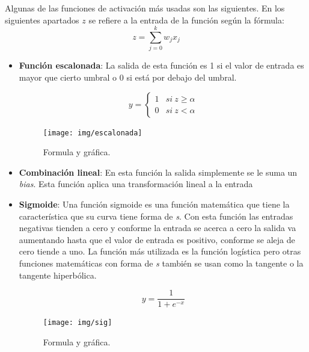 \documentclass[12pt,a4paper]{article}
\begin{document}
Algunas de las funciones de activación más usadas son las siguientes. En los siguientes apartados $z$ se refiere a la entrada de la función según la fórmula:
\begin{equation*}
z = \sum_{j=0}^{k} w_{j} x_{j}
\end{equation*}

\begin{itemize}
\item \textbf{Función escalonada}: La salida de esta función es 1 si el valor de entrada es mayor que cierto umbral o 0 si está por debajo del umbral.

\begin{figure}[H]
\centering\begin{minipage}[H]{0.5\textwidth}
\large
\begin{equation*}
y = \begin{cases}
1 & si \: z \geq \alpha \\
0 & si \: z < \alpha
\end{cases}
\end{equation*}
\end{minipage}%
\begin{minipage}[t]{0.5\textwidth}
\texttt{[image: img/escalonada]}
\end{minipage}
\caption{Formula y gráfica.}
\end{figure}

\item \textbf{Combinación lineal}: En esta función la salida simplemente se le suma un \textit{bias}. Esta función aplica una transformación lineal a la entrada

\item \textbf{Sigmoide}: Una función sigmoide es una función matemática que tiene la característica que su curva tiene forma de \textit{s}. Con esta función las entradas negativas tienden a cero y conforme la entrada se acerca a cero la salida va aumentando hasta que el valor de entrada es positivo, conforme se aleja de cero tiende a uno. La función más utilizada es la función logística pero otras funciones matemáticas con forma de \textit{s} también se usan como la tangente o la tangente hiperbólica.

\begin{figure}[H]
\centering\begin{minipage}[H]{0.5\textwidth}
\large
\begin{equation*}
y = \frac{1}{1+e^{-x}}
\end{equation*}
\end{minipage}%
\begin{minipage}[t]{0.5\textwidth}
\texttt{[image: img/sig]}
\end{minipage}
\caption{Formula y gráfica.}
\end{figure}


\end{itemize}
\end{document}
